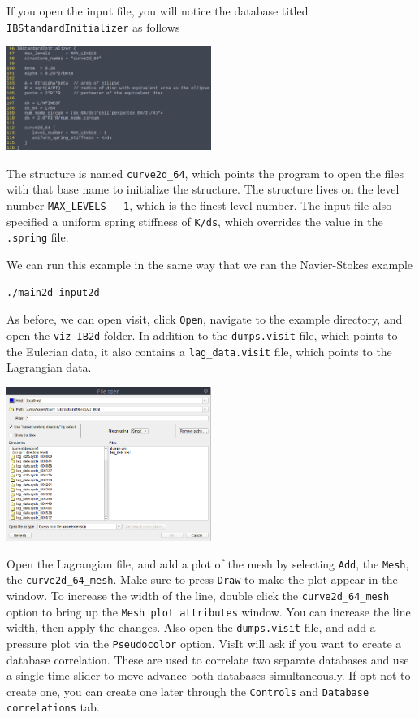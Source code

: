 \documentclass{article}
\begin{document}
If you open the input file, you will notice the database titled \verb|IBStandardInitializer| as follows

\begin{center}
\includegraphics[width=0.5\textwidth]{Graphs/IB-ex1/input_IBStandardInitializer_initial.png}
\end{center}

The structure is named \verb|curve2d_64|, which points the program to open the files with that base name to initialize the structure. The structure lives on the level number \verb|MAX_LEVELS - 1|, which is the finest level number. The input file also specified a uniform spring stiffness of \verb|K/ds|, which overrides the value in the \verb|.spring| file.

We can run this example in the same way that we ran the Navier-Stokes example
\begin{verbatim}
./main2d input2d
\end{verbatim}
As before, we can open visit, click \verb|Open|, navigate to the example directory, and open the \verb|viz_IB2d| folder. In addition to the \verb|dumps.visit| file, which points to the Eulerian data, it also contains a \verb|lag_data.visit| file, which points to the Lagrangian data. 

\begin{center}
\includegraphics[width=0.5\textwidth]{Graphs/IB-ex1/visit_open_file.png}
\end{center}

Open the Lagrangian file, and add a plot of the mesh by selecting \verb|Add|, the \verb|Mesh|, the \verb|curve2d_64_mesh|. Make sure to press \verb|Draw| to make the plot appear in the window. To increase the width of the line, double click the \verb|curve2d_64_mesh| option to bring up the \verb|Mesh plot attributes| window. You can increase the line width, then apply the changes. Also open the \verb|dumps.visit| file, and add a pressure plot via the \verb|Pseudocolor| option. VisIt will ask if you want to create a database correlation. These are used to correlate two separate databases and use a single time slider to move advance both databases simultaneously. If opt not to create one, you can create one later through the \verb|Controls| and \verb|Database correlations| tab.
\end{document}

